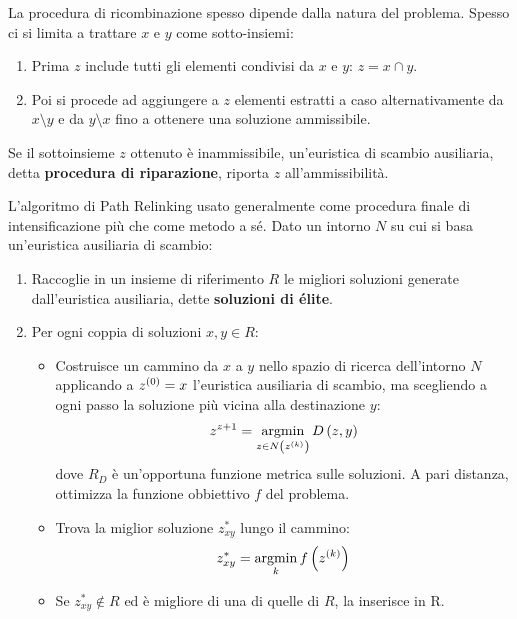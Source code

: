 \documentclass[\main/main.tex]{subfiles}
\begin{document}
\begin{multicols}{2}
\begin{definition}
    La procedura di ricombinazione spesso dipende dalla natura del problema. Spesso ci si limita a trattare \(x\) e \(y\) come sotto-insiemi:
    \begin{enumerate}
        \item Prima \(z\) include tutti gli elementi condivisi da \(x\) e \(y\): \(z = x \cap y\).
        \item Poi si procede ad aggiungere a \(z\) elementi estratti a caso alternativamente da \(x \setminus y\) e da \(y \setminus x\) fino a ottenere una soluzione ammissibile.
    \end{enumerate}
    
    Se il sottoinsieme \(z\) ottenuto è inammissibile, un'euristica di scambio ausiliaria, detta \textbf{procedura di riparazione}, riporta \(z\) all'ammissibilità.
\end{definition}
\end{multicols}
\clearpage
\begin{definition}
    L'algoritmo di Path Relinking usato generalmente come procedura finale di intensificazione più che come metodo a sé. Dato un intorno \(N\) su cui si basa un'euristica ausiliaria di scambio:
    \begin{enumerate}
        \item Raccoglie in un insieme di riferimento \(R\) le migliori soluzioni generate dall'euristica ausiliaria, dette \textbf{soluzioni di élite}.
        \item Per ogni coppia di soluzioni \(x, y \in R\):
        \begin{itemize}
            \item Costruisce un cammino da \(x\) a \(y\) nello spazio di ricerca dell'intorno \(N\) applicando a \(z^{\left(0\right)} = x\) l'euristica ausiliaria di scambio, ma scegliendo a ogni passo la soluzione più vicina alla destinazione \(y\):
            \[
                z^{z+1} = \operatorname*{argmin}_{z \in N\left(z^{\left(k\right)}\right)} D\left(z, y\right)
            \]
            dove \(R_D\) è un'opportuna funzione metrica sulle soluzioni. A pari distanza, ottimizza la funzione obbiettivo \(f\) del problema.
            \item Trova la miglior soluzione \(z^*_{xy}\) lungo il cammino:
            \[
                z_{xy}^* = \operatorname*{argmin}_k f\left(z^{\left(k\right)}\right)
            \]
            \item Se \(z_{xy}^* \not\in R\) ed è migliore di una di quelle di \(R\), la inserisce in R.
        \end{itemize}
    \end{enumerate}
\end{definition}
\end{document}
